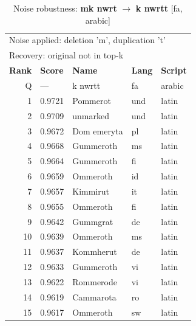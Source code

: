 \begin{table}[htbp]
\centering
\small
\caption{Noise robustness: \textbf{mk nwrt} $\rightarrow$ \textbf{k nwrtt} [fa, arabic]}
\label{tab:noise-38}
\begin{tabular}{rllll}
\toprule
\multicolumn{5}{l}{\small Noise applied: deletion 'm', duplication 't'} \\
\multicolumn{5}{l}{\small Recovery: original not in top-k} \\
\midrule
\textbf{Rank} & \textbf{Score} & \textbf{Name} & \textbf{Lang} & \textbf{Script} \\
\midrule
\rowcolor{gray!20} Q & --- & k nwrtt & fa & arabic \\
\midrule
1 & 0.9721 & Pommerot & und & latin \\
2 & 0.9709 & unmarked & und & latin \\
3 & 0.9672 & Dom emeryta & pl & latin \\
4 & 0.9668 & Gummeroth & ms & latin \\
5 & 0.9664 & Gummeroth & fi & latin \\
6 & 0.9659 & Ommeroth & id & latin \\
7 & 0.9657 & Kimmirut & it & latin \\
8 & 0.9655 & Ommeroth & fi & latin \\
9 & 0.9642 & Gummgrat & de & latin \\
10 & 0.9639 & Ommeroth & ms & latin \\
11 & 0.9637 & Kommherut & de & latin \\
12 & 0.9633 & Gummeroth & vi & latin \\
13 & 0.9622 & Rommerode & vi & latin \\
14 & 0.9619 & Cammarota & ro & latin \\
15 & 0.9617 & Ommeroth & sw & latin \\
\bottomrule
\end{tabular}
\end{table}


